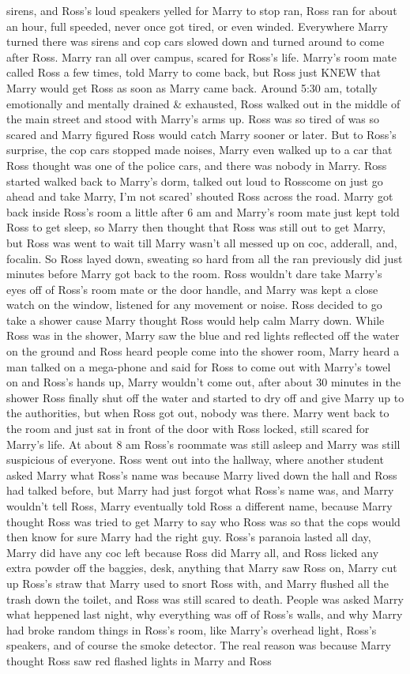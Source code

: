 \documentclass[12pt]{book}
\begin{document}
sirens, and Ross's loud speakers yelled for Marry to stop ran, Ross ran for about an hour, full speeded, never once got tired, or even winded. Everywhere Marry turned there was sirens and cop cars slowed down and turned around to come after Ross. Marry ran all over campus, scared for Ross's life. Marry's room mate called Ross a few times, told Marry to come back, but Ross just KNEW that Marry would get Ross as soon as Marry came back. Around 5:30 am, totally emotionally and mentally drained \& exhausted, Ross walked out in the middle of the main street and stood with Marry's arms up. Ross was so tired of was so scared and Marry figured Ross would catch Marry sooner or later. But to Ross's surprise, the cop cars stopped made noises, Marry even walked up to a car that Ross thought was one of the police cars, and there was nobody in Marry. Ross started walked back to Marry's dorm, talked out loud to Rosscome on just go ahead and take Marry, I'm not scared' shouted Ross across the road. Marry got back inside Ross's room a little after 6 am and Marry's room mate just kept told Ross to get sleep, so Marry then thought that Ross was still out to get Marry, but Ross was went to wait till Marry wasn't all messed up on coc, adderall, and, focalin. So Ross layed down, sweating so hard from all the ran previously did just minutes before Marry got back to the room. Ross wouldn't dare take Marry's eyes off of Ross's room mate or the door handle, and Marry was kept a close watch on the window, listened for any movement or noise. Ross decided to go take a shower cause Marry thought Ross would help calm Marry down. While Ross was in the shower, Marry saw the blue and red lights reflected off the water on the ground and Ross heard people come into the shower room, Marry heard a man talked on a mega-phone and said for Ross to come out with Marry's towel on and Ross's hands up, Marry wouldn't come out, after about 30 minutes in the shower Ross finally shut off the water and started to dry off and give Marry up to the authorities, but when Ross got out, nobody was there. Marry went back to the room and just sat in front of the door with Ross locked, still scared for Marry's life. At about 8 am Ross's roommate was still asleep and Marry was still suspicious of everyone. Ross went out into the hallway, where another student asked Marry what Ross's name was because Marry lived down the hall and Ross had talked before, but Marry had just forgot what Ross's name was, and Marry wouldn't tell Ross, Marry eventually told Ross a different name, because Marry thought Ross was tried to get Marry to say who Ross was so that the cops would then know for sure Marry had the right guy. Ross's paranoia lasted all day, Marry did have any coc left because Ross did Marry all, and Ross licked any extra powder off the baggies, desk, anything that Marry saw Ross on, Marry cut up Ross's straw that Marry used to snort Ross with, and Marry flushed all the trash down the toilet, and Ross was still scared to death. People was asked Marry what heppened last night, why everything was off of Ross's walls, and why Marry had broke random things in Ross's room, like Marry's overhead light, Ross's speakers, and of course the smoke detector. The real reason was because Marry thought Ross saw red flashed lights in Marry and Ross 
\end{document}

